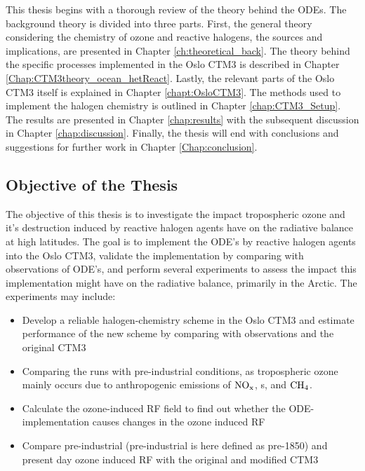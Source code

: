 This thesis begins with a thorough review of the theory behind the ODEs. The background theory is divided into three parts. First, the general theory considering the chemistry of ozone and reactive halogens, the sources and implications, are presented in Chapter \ref{ch:theoretical_back}. The theory behind the specific processes implemented in the Oslo CTM3 is described in Chapter \ref{Chap:CTM3theory_ocean_hetReact}. Lastly, the relevant parts of the Oslo CTM3 itself is explained in Chapter \ref{chapt:OsloCTM3}. The methods used to implement the halogen chemistry is outlined in Chapter \ref{chap:CTM3_Setup}. The results are presented in Chapter \ref{chap:results} with the subsequent discussion in Chapter \ref{chap:discussion}. Finally, the thesis will end with conclusions and suggestions for further work in Chapter \ref{Chap:conclusion}. 


\subsection{Objective of the Thesis}

The objective of this thesis is to investigate the impact tropospheric ozone and it's destruction induced by reactive halogen agents have on the radiative balance at high latitudes. The goal is to implement the ODE's by reactive halogen agents into the Oslo CTM3, validate the implementation by comparing with observations of ODE's, and perform several experiments to assess the  impact this implementation might have on the radiative balance, primarily in the Arctic. The experiments may include: 

\begin{itemize}
    \item Develop a reliable halogen-chemistry scheme in the Oslo CTM3 and estimate performance of the new scheme by comparing with observations and the original CTM3
    \item Comparing the runs with pre-industrial conditions, as tropospheric ozone mainly occurs due to anthropogenic emissions of $\mathrm{NO_x}$, s,  and $\mathrm{CH_4}$.
    \item Calculate the ozone-induced RF field to find out whether the ODE-implementation causes changes in the ozone induced RF 
    \item Compare pre-industrial (pre-industrial is here defined as pre-1850) and present day ozone induced RF with the original and modified CTM3
\end{itemize}

